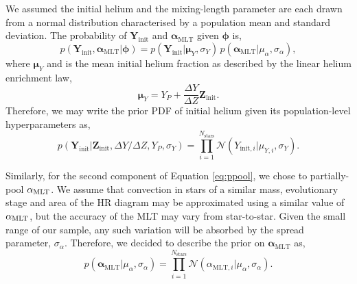 We assumed the initial helium and the mixing-length parameter are each drawn from a normal distribution characterised by a population mean and standard deviation. The probability of $\boldsymbol{Y}_\mathrm{init}$ and $\boldsymbol{\alpha}_\mathrm{MLT}$ given $\boldsymbol{\phi}$ is,
%
\begin{equation}
    p(\boldsymbol{Y}_\mathrm{init}, \boldsymbol{\alpha}_\mathrm{MLT} | \boldsymbol{\phi}) = p(\boldsymbol{Y}_\mathrm{init} | \boldsymbol{\mu}_Y, \sigma_Y) \, p(\boldsymbol{\alpha}_\mathrm{MLT} | \mu_\alpha, \sigma_\alpha),
    \label{eq:ppool}
\end{equation}
%
where $\boldsymbol{\mu}_Y$ and is the mean initial helium fraction as described by the linear helium enrichment law,
%
\begin{equation}
    \boldsymbol{\mu}_{Y} = Y_P + \frac{\Delta Y}{\Delta Z} \boldsymbol{Z}_{\mathrm{init}}.\label{eq:helium}
\end{equation}
%
Therefore, we may write the prior PDF of initial helium given its population-level hyperparameters as,
%
\begin{equation}
    p(\boldsymbol{Y}_{\mathrm{init}} | \boldsymbol{Z}_{\mathrm{init}}, {\Delta Y}/{\Delta Z}, Y_P, \sigma_Y) = \prod_{i=1}^{N_\mathrm{stars}} \mathcal{N}({Y}_{\mathrm{init}, i} | {\mu}_{Y, i}, \sigma_Y).
\end{equation}
%

Similarly, for the second component of Equation \ref{eq:ppool}, we chose to partially-pool ${\alpha_\mathrm{MLT}}$. We assume that convection in stars of a similar mass, evolutionary stage and area of the HR diagram may be approximated using a similar value of ${\alpha_\mathrm{MLT}}$, but the accuracy of the MLT may vary from star-to-star. Given the small range of our sample, any such variation will be absorbed by the spread parameter, $\sigma_\alpha$. Therefore, we decided to describe the prior on $\boldsymbol{\alpha}_\mathrm{MLT}$ as,
%
\begin{equation}
    p(\boldsymbol{\alpha}_{\mathrm{MLT}} | \mu_\alpha, \sigma_\alpha) = \prod_{i=1}^{N_\mathrm{stars}} \mathcal{N}({\alpha}_{\mathrm{MLT}, i} | \mu_\alpha, \sigma_\alpha).
\end{equation}
%

